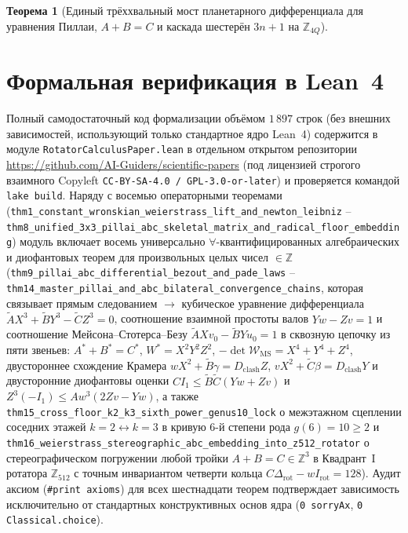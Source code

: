 \documentclass[11pt,a4paper]{article}
\theoremstyle{plain}
\newtheorem{theorem}{Теорема}[section]
\theoremstyle{definition}
\begin{document}
\begin{theorem}[Единый трёххвальный мост планетарного дифференциала для уравнения Пиллаи, $A+B=C$ и каскада шестерён $3n+1$ на $\mathbb{Z}_{4Q}$]
\begin{enumerate}[label=\textbf{(\roman*)},leftmargin=*]
\end{enumerate}
\end{theorem}

\section{Формальная верификация в Lean~4}
\label{sec:lean4}

Полный самодостаточный код формализации объёмом $1\,897$ строк (без внешних зависимостей, использующий только стандартное ядро Lean~4) содержится в модуле \texttt{RotatorCalculusPaper.lean} в отдельном открытом репозитории \url{https://github.com/AI-Guiders/scientific-papers} (под лицензией строгого взаимного Copyleft \texttt{CC-BY-SA-4.0 / GPL-3.0-or-later}) и проверяется командой \texttt{lake build}. Наряду с восемью операторными теоремами (\texttt{thm1\_constant\_wronskian\_weierstrass\_lift\_and\_newton\_leibniz} -- \texttt{thm8\_unified\_3x3\_pillai\_abc\_skeletal\_matrix\_and\_radical\_floor\_embedding}) модуль включает восемь универсально $\forall$-квантифицированных алгебраических и диофантовых теорем для произвольных целых чисел $\in\mathbb{Z}$ (\texttt{thm9\_pillai\_abc\_differential\_bezout\_and\_pade\_laws} -- \texttt{thm14\_master\_pillai\_and\_abc\_bilateral\_convergence\_chains}, которая связывает прямым следованием $\to$ кубическое уравнение дифференциала $\widetilde{A}X^3+\widetilde{B}Y^3-\widetilde{C}Z^3=0$, соотношение взаимной простоты валов $Yw-Zv=1$ и соотношение Мейсона--Стотерса--Безу $\widetilde{A}Xv_0-\widetilde{B}Yu_0=1$ в сквозную цепочку из пяти звеньев: $A^*+B^*=C^*$, $W^* = X^2 Y^2 Z^2$, $-\det\mathcal{W}_{\mathrm{MS}} = X^4+Y^4+Z^4$, двустороннее схождение Крамера $w X^2 + \widetilde{B}\gamma = D_{\mathrm{clash}} Z$, $v X^2 + \widetilde{C}\beta = D_{\mathrm{clash}} Y$ и двусторонние диофантовы оценки $C I_1 \le \widetilde{B}\widetilde{C}(Yw+Zv)$ и $Z^3(-I_1) \le A w^3(2Zv-Yw)$, а также \texttt{thm15\_cross\_floor\_k2\_k3\_sixth\_power\_genus10\_lock} о межэтажном сцеплении соседних этажей $k=2 \leftrightarrow k=3$ в кривую 6-й степени рода $g(6)=10\ge 2$ и \texttt{thm16\_weierstrass\_stereographic\_abc\_embedding\_into\_z512\_rotator} о стереографическом погружении любой тройки $A+B=C\in\mathbb{Z}^3$ в Квадрант~I ротатора $\mathbb{Z}_{512}$ с точным инвариантом четверти кольца $C\Delta_{\mathrm{rot}} - w I_{\mathrm{rot}} = 128$). Аудит аксиом (\texttt{\#print axioms}) для всех шестнадцати теорем подтверждает зависимость исключительно от стандартных конструктивных основ ядра (\texttt{0 sorryAx}, \texttt{0 Classical.choice}).
\end{document}
